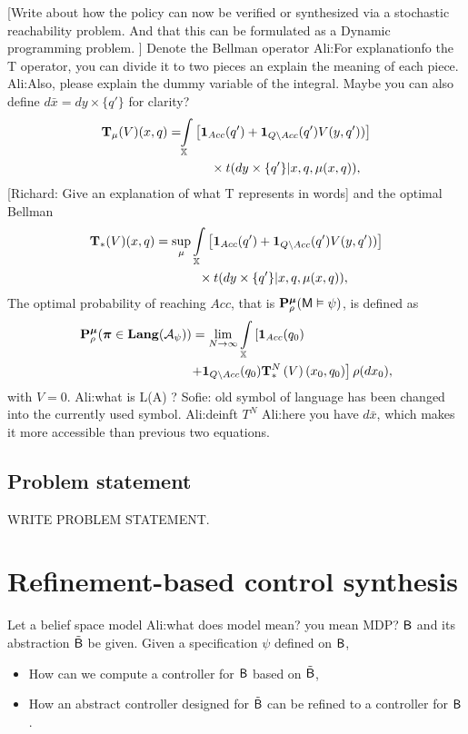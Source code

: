 \documentclass{ifacconf}
\newcommand{\red}[1]{{\color{red} #1}}
\renewcommand{\axx}[1]{{\color{orange} Ali:#1}}
\begin{document}
\red{[Write about how the policy can now be verified or synthesized via a stochastic reachability problem. And that this can be formulated as a Dynamic programming problem.  ]}
Denote the Bellman operator
\axx{For explanationfo the T operator, you can divide it to two pieces an explain the meaning of each piece.}
\axx{Also, please explain the dummy variable of the integral. Maybe you can also define $d\bar{x}=dy\times\{q'\}$ for clarity?}
\begin{align}\label{eq:V_recopt_inf}
& \Bel_\pol (V)(x,q) =\!\!\int_{\bar\X}  \left[\mathbf 1_{Acc}(q')+  \mathbf 1_{Q\setminus Acc}( q')V( y, q'))\right]\notag\\&\hspace{3cm}\hfill 
\times \bar{\tr}(d y\times\{q'\}|x,q,\pol(x,q)),
\end{align}
\red{[Richard: Give an explanation of what T represents in words]}
and the optimal Bellman 
\begin{align}\label{eq:V_recopt_inf}
& \Bel_\ast (V)(x,q) =\sup_\pol\int_{\X}\left[\mathbf 1_{Acc}( q')+  \mathbf 1_{Q\setminus Acc}(q')V(y,q'))\right]\notag\\&\hspace{3cm}\hfill\times \bar{\tr}(d y\times\{q'\}|x,q,\pol(x,q)),
\end{align}
The optimal probability of reaching $Acc $, that is $\mathbf{P}_\rho^{\boldsymbol{\mu}}(\mathsf{M}\vDash\psi) $, is defined as
\begin{align*}
&\P_\init^\polb
(\word \in\Language(\mathcal A_\psi))= 	\lim_{N\rightarrow \infty}\int_{\bar{\X}}\left[\mathbf 1_{Acc}( q_0)\right.\\ &\hspace{3cm} \left.+ \mathbf 1_{Q\setminus Acc}(q_0) \Bel^N_\ast\left( V\right)(x_0,q_0)\right] {\init} (d \bar x_0),
\end{align*}
with $V=0$.
\axx{what is L(A) ? }\red{Sofie: old symbol of language has been changed into the currently used symbol.}
\axx{deinft $T^N$}
\axx{here you have $d\bar{x}$, which makes it more accessible than previous two equations.}

\subsection{Problem statement}
\red{WRITE PROBLEM STATEMENT.}
\section{Refinement-based control synthesis} \label{sec:refinement}
 Let a belief space model \axx{what does model mean? you mean MDP?} $\mathsf{B}$ and its abstraction $\tilde {\mathsf{B}}$ be given.  Given a specification $\psi$ defined on $\mathsf{B}$,  \begin{itemize}
	\item How can we compute a controller for $\mathsf{B}$ based on $\tilde {\mathsf{B}}$,
	\item How an abstract controller designed for $\tilde{\mathsf{B}}$ can be refined to a controller for $\mathsf{B}$.
\end{itemize}
\end{document}
